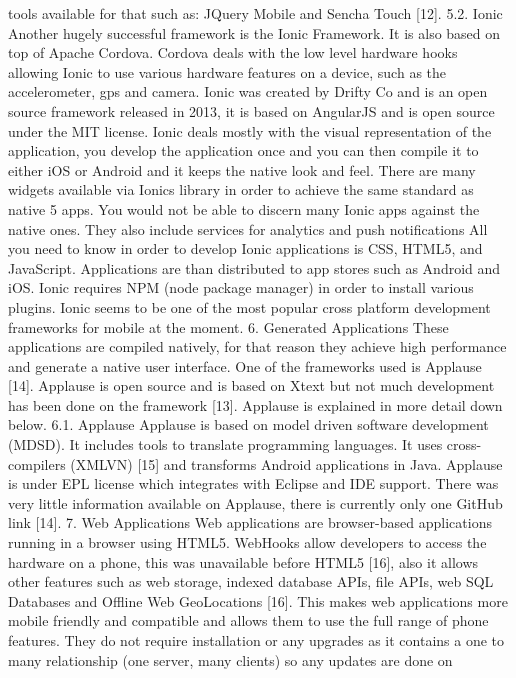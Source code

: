 tools available for that such as: JQuery Mobile and Sencha Touch [12].
5.2. Ionic
Another hugely successful framework is the Ionic Framework. It is also
based on top of Apache Cordova. Cordova deals with the low level hardware
hooks allowing Ionic to use various hardware features on a device, such as
the accelerometer, gps and camera.
Ionic was created by Drifty Co and is an open source framework released
in 2013, it is based on AngularJS and is open source under the MIT license.
Ionic deals mostly with the visual representation of the application, you
develop the application once and you can then compile it to either iOS or
Android and it keeps the native look and feel. There are many widgets
available via Ionics library in order to achieve the same standard as native
5
apps. You would not be able to discern many Ionic apps against the native
ones. They also include services for analytics and push notifications
All you need to know in order to develop Ionic applications is CSS, HTML5,
and JavaScript. Applications are than distributed to app stores such as
Android and iOS. Ionic requires NPM (node package manager) in order to
install various plugins. Ionic seems to be one of the most popular cross
platform development frameworks for mobile at the moment.
6. Generated Applications
These applications are compiled natively, for that reason they achieve
high performance and generate a native user interface. One of the
frameworks used is Applause [14]. Applause is open source and is based on
Xtext but not much development has been done on the framework [13].
Applause is explained in more detail down below.
6.1. Applause
Applause is based on model driven software development (MDSD). It
includes tools to translate programming languages. It uses cross-compilers
(XMLVN) [15] and transforms Android applications in Java. Applause is
under EPL license which integrates with Eclipse and IDE support. There was
very little information available on Applause, there is currently only one
GitHub link [14].
7. Web Applications
Web applications are browser-based applications running in a browser
using HTML5. WebHooks allow developers to access the hardware on a
phone, this was unavailable before HTML5 [16], also it allows other features
such as web storage, indexed database APIs, file APIs, web SQL Databases and
Offline Web GeoLocations [16]. This makes web applications more mobile
friendly and compatible and allows them to use the full range of phone
features. They do not require installation or any upgrades as it contains a one
to many relationship (one server, many clients) so any updates are done on
